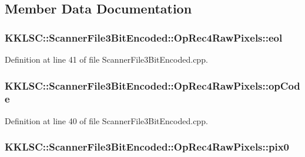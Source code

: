 \subsection{Member Data Documentation}
\subsubsection[{\texorpdfstring{eol}{eol}}]{ K\+K\+L\+S\+C\+::\+Scanner\+File3\+Bit\+Encoded\+::\+Op\+Rec4\+Raw\+Pixels\+::eol}\hypertarget{struct_scanner_file3_bit_encoded_1_1_op_rec4_raw_pixels_a3136b43f00adeac5752526ef860aed49}{}\label{struct_scanner_file3_bit_encoded_1_1_op_rec4_raw_pixels_a3136b43f00adeac5752526ef860aed49}


Definition at line 41 of file Scanner\+File3\+Bit\+Encoded.\+cpp.

\subsubsection[{\texorpdfstring{op\+Code}{opCode}}]{ K\+K\+L\+S\+C\+::\+Scanner\+File3\+Bit\+Encoded\+::\+Op\+Rec4\+Raw\+Pixels\+::op\+Code}\hypertarget{struct_scanner_file3_bit_encoded_1_1_op_rec4_raw_pixels_a045c32dd22bf6c13ea278ef7bd09babe}{}\label{struct_scanner_file3_bit_encoded_1_1_op_rec4_raw_pixels_a045c32dd22bf6c13ea278ef7bd09babe}


Definition at line 40 of file Scanner\+File3\+Bit\+Encoded.\+cpp.

\subsubsection[{\texorpdfstring{pix0}{pix0}}]{ K\+K\+L\+S\+C\+::\+Scanner\+File3\+Bit\+Encoded\+::\+Op\+Rec4\+Raw\+Pixels\+::pix0}\hypertarget{struct_scanner_file3_bit_encoded_1_1_op_rec4_raw_pixels_a489d0fe4904e06dff298e7629bb8429a}{}\label{struct_scanner_file3_bit_encoded_1_1_op_rec4_raw_pixels_a489d0fe4904e06dff298e7629bb8429a}


